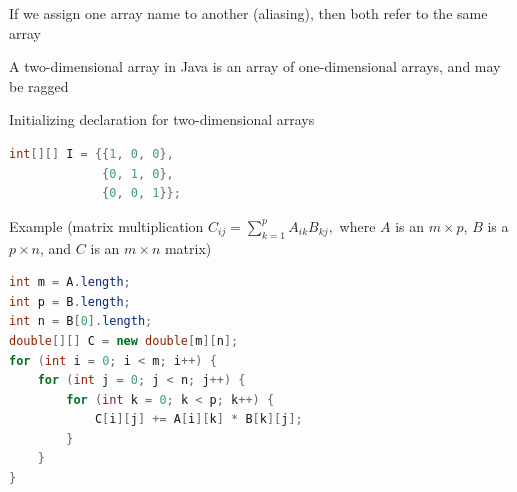 \documentclass[8pt,a4paper,compress]{beamer}
\begin{document}
\begin{frame}[fragile]
\pause

If we assign one array name to another (aliasing), then both refer to the same array

\pause\bigskip

A two-dimensional array in Java is an array of one-dimensional arrays, and may be ragged

\pause\bigskip

Initializing declaration for two-dimensional arrays

\smallskip

\begin{lstlisting}[language=Java,style=focusin]
int[][] I = {{1, 0, 0}, 
             {0, 1, 0}, 
             {0, 0, 1}};
\end{lstlisting}

\pause\bigskip

Example (matrix multiplication $C_{ij}=\sum_{k=1}^{p} A_{ik}B_{kj},$ where $A$ is an $m\times p$, $B$ is a $p \times n$, and $C$ is an $m\times n$ matrix)

\smallskip

\begin{lstlisting}[language=Java,style=focusin]
int m = A.length;
int p = B.length;
int n = B[0].length;
double[][] C = new double[m][n];
for (int i = 0; i < m; i++) {
    for (int j = 0; j < n; j++) {
        for (int k = 0; k < p; k++) {
            C[i][j] += A[i][k] * B[k][j];
        }
    }
}
\end{lstlisting}
\end{frame}
\end{document}
